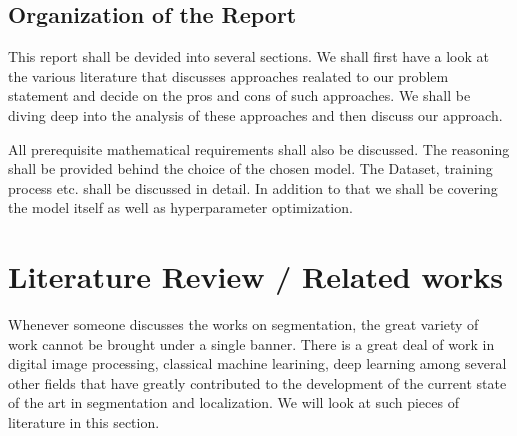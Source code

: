 \documentclass[19pt]{article}
\begin{document}
\subsection{Organization of the Report}
    This report shall be devided into several sections. We shall first have a look at the various literature that discusses approaches realated to our problem statement and decide on the pros and cons of such approaches. We shall be diving deep into the analysis of these approaches and then discuss our approach. 

    All prerequisite mathematical requirements shall also be discussed. The reasoning shall be provided behind the choice of the chosen model. The Dataset, training process etc. shall be discussed in detail. In addition to that we shall be covering the model itself as well as hyperparameter optimization.
    
\newpage
\section{Literature Review / Related works} 
Whenever someone discusses the works on segmentation, the great variety of work cannot be brought under a single banner. There is a great deal of work in digital image processing, classical machine learining, deep learning among several other fields that have greatly contributed to the development of the current state of the art in segmentation and localization. We will look at such pieces of literature in this section.
\end{document}
